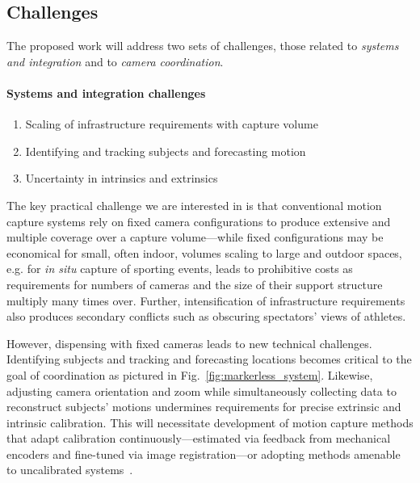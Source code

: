 \documentclass[11pt]{article}
\begin{document}
\subsection{Challenges}

The proposed work will address two sets of challenges, those related to
\emph{systems and integration} and to
\emph{camera coordination}.

\paragraph{Systems and integration challenges}

\begin{enumerate}
  \item Scaling of infrastructure requirements with capture volume
  \item Identifying and tracking subjects and forecasting motion
  \item Uncertainty in intrinsics and extrinsics
\end{enumerate}
The key practical challenge we are interested in is that conventional motion
capture systems rely on fixed camera configurations to produce extensive and
multiple coverage over a capture volume---while fixed configurations may be
economical for small, often indoor, volumes scaling to large and outdoor spaces,
e.g. for \emph{in situ} capture of sporting events, leads to prohibitive costs
as requirements for numbers of cameras and the size of their support structure
multiply many times over.
Further, intensification of infrastructure requirements also produces secondary
conflicts such as obscuring spectators' views of athletes.

However, dispensing with fixed cameras
leads to new technical challenges.
Identifying subjects and tracking and forecasting locations becomes critical
to the goal of coordination as pictured in Fig.~\ref{fig:markerless_system}.
Likewise, adjusting camera orientation and zoom while simultaneously collecting
data to reconstruct subjects' motions undermines requirements for precise
extrinsic and intrinsic calibration.
This will necessitate development of motion capture methods that adapt
calibration continuously---estimated via feedback from mechanical encoders and
fine-tuned via image registration---or adopting methods amenable to uncalibrated
systems~\citep{bachmann20193dv,xu2022bmvc}.
\end{document}
